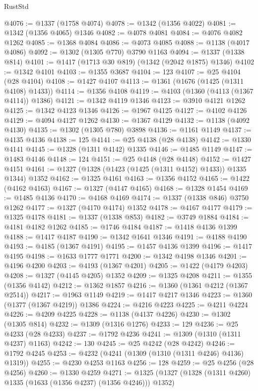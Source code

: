 \begin{lexlean}{RustStd}
\begin{coremodule}
@4076 := @1337 (@1758 @4074)
@4078 := @1342 (@1356 @4022)
@4081 := @1342 (@1356 @4065) @1346
@4082 := @4078 @4081
@4084 := @4076 @4082 @1262
@4085 := @1368 @4084
@4086 := @4073 @4085
@4088 := @1138 (@4017 @4086)
@4092 := @1302 (@1305 @770) @3790 @1163
@4094 := @1337 (@1338 @814)
@4101 := @1417 (@1713 @30 @819) (@1342 (@2042 @1875) @1346)
@4102 := @1342 @4101
@4103 := @1355 @3687
@4104 := 123
@4107 := @25 @4104 (@28 @4104)
@4108 := @1427 @4107
@4113 := @1361 (@1676 (@1425 (@1311 @4108) @1433))
@4114 := @1356 @4108
@4119 := @4103 (@1360 (@4113 (@1367 @4114)) @1386)
@4121 := @1342 @4119 @1346
@4123 := @3910 @4121 @1262
@4125 := @1342 @4123 @1346
@4126 := @1967 @4125
@4127 := @4102 @4126
@4129 := @4094 @4127 @1262
@4130 := @1367 @4129
@4132 := @1138 (@4092 @4130)
@4135 := @1302 (@1305 @780) @3898
@4136 := @1161 @1149
@4137 := @4135 @4136
@4138 := 125
@4141 := @25 @4138 (@28 @4138)
@4142 := @1330 @4141
@4145 := @1328 (@1311 @4142) @1335
@4146 := @1485 @1149
@4147 := @1483 @4146
@4148 := 124
@4151 := @25 @4148 (@28 @4148)
@4152 := @1427 @4151
@4161 := @1327 (@1328 (@1423 (@1425 (@1311 @4152) @1433)) @1335 @1344) @1352
@4162 := @1325 @4161
@4163 := @1356 @4152
@4165 := @1422 (@4162 @4163)
@4167 := @1327 (@4147 @4165)
@4168 := @1328 @1454
@4169 := @1485 @4136
@4170 := @4168 @4169
@4174 := @1337 (@1338 @846) @3750 @1262
@4177 := @1327 (@4170 @4174) @1352
@4178 := @4167 @4177
@4179 := @1325 @4178
@4181 := @1337 (@1338 @853)
@4182 := @3749 @1884
@4184 := @4181 @4182 @1262
@4185 := @1746 @4184
@4187 := @1418 @4136 @1399
@4188 := @1417 @4187
@4190 := @1342 @1641 @1346
@4191 := @4188 @4190
@4193 := @4185 (@1367 @4191)
@4195 := @1457 @4136 @1399
@4196 := @1417 @4195
@4198 := @1633 @1777 @1771
@4200 := @1342 @4198 @1346
@4201 := @4196 @4200
@4203 := @4193 (@1367 @4201)
@4205 := @1422 (@4179 @4203)
@4208 := @1327 (@4145 @4205) @1352
@4209 := @1325 @4208
@4211 := @1355 (@1356 @4142)
@4212 := @1362 @1857
@4216 := @1360 (@1361 @4212 (@1367 @2514))
@4217 := @1963 @1149
@4219 := @1417 @4217 @1346
@4223 := @1360 (@1377 (@1367 @4219)) @1386
@4224 := @4216 @4223
@4225 := @4211 @4224
@4226 := @4209 @4225
@4228 := @1138 (@4137 @4226)
@4230 := @1302 (@1305 @814)
@4232 := @1309 (@1316 @1276)
@4233 := 129
@4236 := @25 @4233 (@28 @4233)
@4237 := @1792 @4236
@4241 := @1309 (@1310 (@1311 @4237) @1163)
@4242 := 130
@4245 := @25 @4242 (@28 @4242)
@4246 := @1792 @4245
@4253 := @4232 (@4241 (@1309 (@1310 (@1311 @4246) @4136) @1319))
@4255 := @4230 @4253 @1163
@4256 := 128
@4259 := @25 @4256 (@28 @4256)
@4260 := @1330 @4259
@4271 := @1325 (@1327 (@1328 (@1311 @4260) @1335 (@1633 (@1356 @4237) (@1356 @4246))) @1352)

\end{coremodule}
\end{lexlean}
